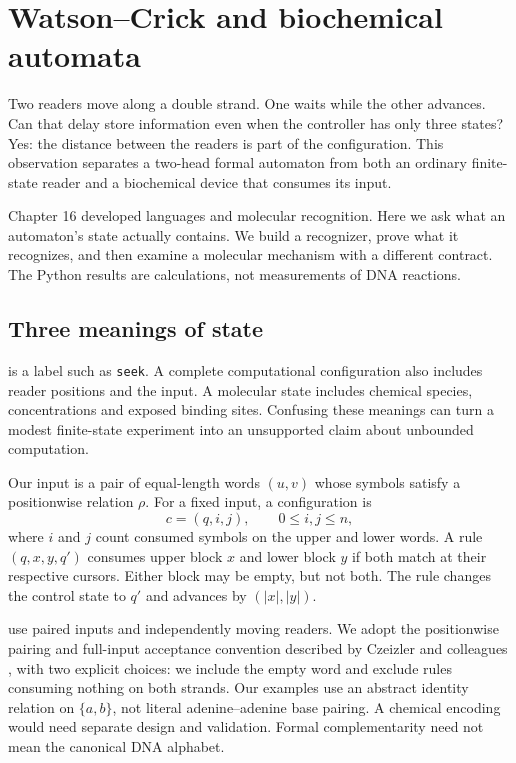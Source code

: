 \chapter{Watson--Crick and biochemical automata}
Two readers move along a double strand. One waits while the other advances.
Can that delay store information even when the controller has only three
states? Yes: the distance between the readers is part of the configuration.
This observation separates a two-head formal automaton from both an ordinary
finite-state reader and a biochemical device that consumes its input.

Chapter 16 developed languages and molecular recognition. Here we ask what an
automaton's state actually contains. We build a recognizer, prove what it
recognizes, and then examine a molecular mechanism with a different contract.
The Python results are calculations, not measurements of DNA reactions.

\section{Three meanings of state}
 is a label such as \texttt{seek}. A complete computational
configuration also includes reader positions and the input. A molecular state
includes chemical species, concentrations and exposed binding sites. Confusing
these meanings can turn a modest finite-state experiment into an unsupported
claim about unbounded computation.

Our input is a pair of equal-length words $(u,v)$ whose symbols satisfy a
positionwise relation $\rho$. For a fixed input, a configuration is
\begin{equation}
 c=(q,i,j),\qquad 0\leq i,j\leq n,
\end{equation}
where $i$ and $j$ count consumed symbols on the upper and lower words.
A rule $(q,x,y,q')$ consumes upper block $x$ and lower block $y$ if both
match at their respective cursors. Either block may be empty, but not both.
The rule changes the control state to $q'$ and advances by $(|x|,|y|)$.


 use paired inputs and independently moving
readers. We adopt the positionwise pairing and full-input acceptance convention
described by Czeizler and colleagues \cite{czeizler}, with two explicit choices:
we include the empty word and exclude rules consuming nothing on both strands.
Our examples use an abstract identity relation on $\{a,b\}$, not literal
adenine--adenine base pairing. A chemical encoding would need separate design
and validation. Formal complementarity need not mean the canonical DNA alphabet.

